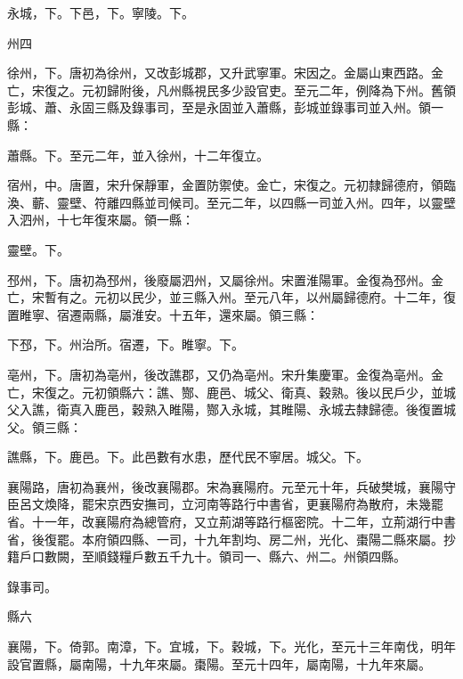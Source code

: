 \begin{pinyinscope}
 永城，下。下邑，下。寧陵。下。



 州四



 徐州，下。唐初為徐州，又改彭城郡，又升武寧軍。宋因之。金屬山東西路。金亡，宋復之。元初歸附後，凡州縣視民多少設官吏。至元二年，例降為下州。舊領彭城、蕭、永固三縣及錄事司，至是永固並入蕭縣，彭城並錄事司並入州。領一縣：



 蕭縣。下。至元二年，並入徐州，十二年復立。



 宿州，中。唐置，宋升保靜軍，金置防禦使。金亡，宋復之。元初隸歸德府，領臨渙、蘄、靈壁、符離四縣並司候司。至元二年，以四縣一司並入州。四年，以靈壁入泗州，十七年復來屬。領一縣：



 靈壁。下。



 邳州，下。唐初為邳州，後廢屬泗州，又屬徐州。宋置淮陽軍。金復為邳州。金亡，宋暫有之。元初以民少，並三縣入州。至元八年，以州屬歸德府。十二年，復置睢寧、宿遷兩縣，屬淮安。十五年，還來屬。領三縣：



 下邳，下。州治所。宿遷，下。睢寧。下。



 亳州，下。唐初為亳州，後改譙郡，又仍為亳州。宋升集慶軍。金復為亳州。金亡，宋復之。元初領縣六：譙、酂、鹿邑、城父、衛真、穀熟。後以民戶少，並城父入譙，衛真入鹿邑，穀熟入睢陽，酂入永城，其睢陽、永城去隸歸德。後復置城父。領三縣：



 譙縣，下。鹿邑。下。此邑數有水患，歷代民不寧居。城父。下。



 襄陽路，唐初為襄州，後改襄陽郡。宋為襄陽府。元至元十年，兵破樊城，襄陽守臣呂文煥降，罷宋京西安撫司，立河南等路行中書省，更襄陽府為散府，未幾罷省。十一年，改襄陽府為總管府，又立荊湖等路行樞密院。十二年，立荊湖行中書省，後復罷。本府領四縣、一司，十九年割均、房二州，光化、棗陽二縣來屬。抄籍戶口數闕，至順錢糧戶數五千九十。領司一、縣六、州二。州領四縣。



 錄事司。



 縣六



 襄陽，下。倚郭。南漳，下。宜城，下。穀城，下。光化，至元十三年南伐，明年設官置縣，屬南陽，十九年來屬。棗陽。至元十四年，屬南陽，十九年來屬。




\end{pinyinscope}
